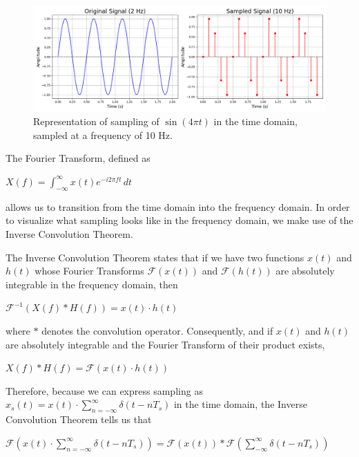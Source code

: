 \documentclass{article}
\begin{document}
\begin{figure}[H]
    \includegraphics[width=\linewidth]{images/leftright_ogsampled.png}
    \caption{Representation of sampling of $\sin(4\pi t)$ in the time domain, sampled at a frequency of 10 Hz.}
    \label{fig:enter-label}
\end{figure}
The Fourier Transform, defined as
\begin{center}
    \begin{math}
       X(f) = \displaystyle \int_{-\infty}^{\infty} x(t)e^{-i2\pi ft}\, dt
    \end{math}
\end{center}
allows us to transition from the time domain into the frequency domain. In order to visualize what sampling looks like in the frequency domain, we make use of the Inverse Convolution Theorem.

The Inverse Convolution Theorem states that if we have two functions $x(t)$ and $h(t)$ whose Fourier Transforms $\mathcal{F}(x(t))$ and $\mathcal{F}(h(t))$ are absolutely integrable in the frequency domain,
then 
\begin{center}
    \begin{math}
        \mathcal{F}^{-1} \left(X(f) * H(f) \right) = x(t) \cdot h(t)
    \end{math}  
\end{center}
where $*$ denotes the convolution operator. 
Consequently, and if $x(t)$ and $h(t)$ are absolutely integrable and the Fourier Transform of their product exists,
\begin{center}
    \begin{math}
        X(f) * H(f) = \mathcal{F}\left(x(t) \cdot h(t)\right)
    \end{math}  
\end{center}

Therefore, because we can express sampling as $x_s(t) = x(t) \cdot \displaystyle\sum_{n=-\infty}^{\infty} \delta (t-nT_s)$ in the time domain, the Inverse Convolution Theorem tells us that %
\begin{center}
    \begin{math}
        \mathcal{F}\left(x(t) \cdot \displaystyle\sum_{n=-\infty}^{\infty} \delta (t-nT_s)\right) = \mathcal{F}(x(t)) * \mathcal{F}\left(\displaystyle \sum_{-\infty}^{\infty} \delta (t-nT_s) \right)
    \end{math}  
\end{center}
\end{document}
